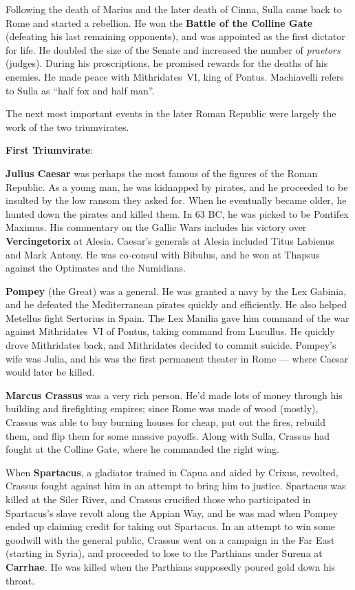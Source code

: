 Following the death of Marius and the later death of Cinna,
Sulla came back to Rome and started a rebellion.
He won the \textbf{Battle of the Colline Gate} (defeating his last remaining opponents),
and was appointed as the first dictator for life.
He doubled the size of the Senate and increased the number of \textit{praetors} (judges).
During his proscriptions, he promised rewards for the deaths of his enemies.
He made peace with Mithridates~VI, king of Pontus.
Machiavelli refers to Sulla as ``half fox and half man''.

The next most important events in the later Roman Republic were largely the work of the two triumvirates.

\textbf{First Triumvirate}:

\textbf{Julius Caesar} was perhaps the most famous of the figures of the Roman Republic.
As a young man, he was kidnapped by pirates,
and he proceeded to be insulted by the low ransom they asked for.
When he eventually became older, he hunted down the pirates and killed them.
In 63 BC, he was picked to be Pontifex Maximus.
His commentary on the Gallic Wars includes his victory over \textbf{Vercingetorix} at Alesia.
Caesar's generals at Alesia included Titus Labienus and Mark Antony.
He was co-consul with Bibulus, and he won at Thapsus against the Optimates and the Numidians.

\textbf{Pompey} (the Great) was a general.
He was granted a navy by the Lex Gabinia, and he defeated the Mediterranean pirates quickly and efficiently.
He also helped Metellus fight Sertorius in Spain.
The Lex Manilia gave him command of the war against Mithridates~VI of Pontus, taking command from Lucullus.
He quickly drove Mithridates back, and Mithridates decided to commit suicide.
Pompey's wife was Julia,
and his was the first permanent theater in Rome --- where Caesar would later be killed.

\textbf{Marcus Crassus} was a very rich person.
He'd made lots of money through his building and firefighting empires;
since Rome was made of wood (mostly), Crassus was able to buy burning houses for cheap,
put out the fires, rebuild them, and flip them for some massive payoffs.
Along with Sulla, Crassus had fought at the Colline Gate, where he commanded the right wing.

When \textbf{Spartacus}, a gladiator trained in Capua and aided by Crixus, revolted,
Crassus fought against him in an attempt to bring him to justice.
Spartacus was killed at the Siler River, and
Crassus crucified those who participated in Spartacus's slave revolt along the Appian Way,
and he was mad when Pompey ended up claiming credit for taking out Spartacus.
In an attempt to win some goodwill with the general public,
Crassus went on a campaign in the Far East (starting in Syria),
and proceeded to lose to the Parthians under Surena at \textbf{Carrhae}.
He was killed when the Parthians supposedly poured gold down his throat.

